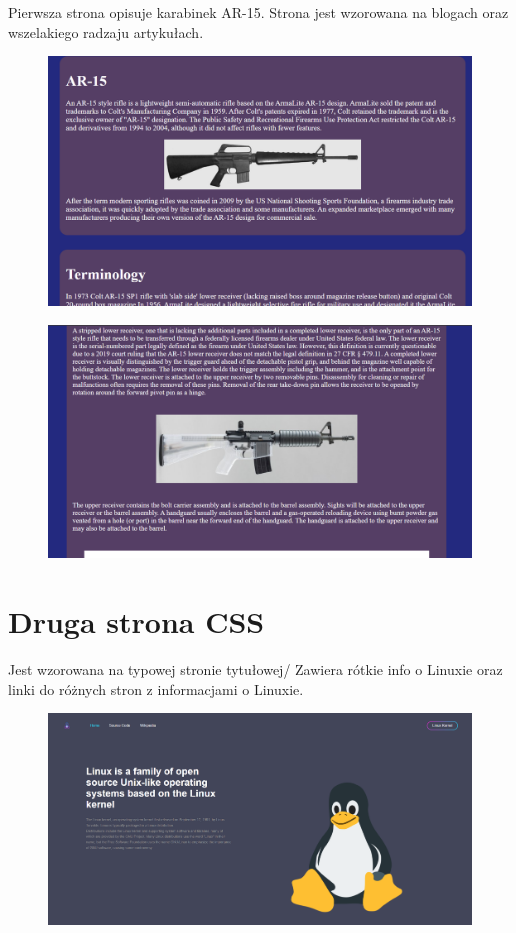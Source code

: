 \documentclass{article}
\begin{document}
Pierwsza strona opisuje karabinek AR-15. Strona jest wzorowana na blogach oraz wszelakiego radzaju artykułach.
\begin{figure}[h!]
    \includegraphics[scale=0.25]{1.png}
    \centering
\end{figure}


\begin{figure}[h!]
    \includegraphics[scale=0.25]{2.png}
    \centering
\end{figure}
 
\newpage
\section{Druga strona CSS}

Jest wzorowana na typowej stronie tytułowej/ Zawiera rótkie info o Linuxie oraz linki do różnych stron z informacjami o Linuxie.

\begin{figure}[h!]
    \includegraphics[scale=0.25]{3.png}
    \centering
\end{figure}
\end{document}
